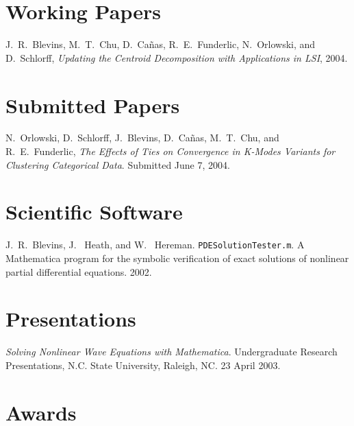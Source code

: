 \documentclass[overlapped,line,final,11pt,letterpaper]{res}
\begin{document}
\begin{resume}
\section{\bf Working Papers}

J.\ R.\ Blevins, M.\ T.\ Chu, D.\ Ca\~{n}as, R.\ E.\ Funderlic, N.\
Orlowski, and D.\ Schlorff, {\em Updating the Centroid Decomposition
  with Applications in LSI}, 2004.


\newpage

\section{\bf Submitted Papers}

N.\ Orlowski, D.\ Schlorff, J.\ Blevins, D.\ Ca\~{n}as, M.\ T.\
Chu, and R.\ E.\ Funderlic, {\em The Effects of Ties on Convergence in
  K-Modes Variants for Clustering Categorical Data}. Submitted June 7,
2004.


\section{\bf Scientific Software}

J.\ R.\ Blevins, J. \ Heath, and W. \
Hereman. \texttt{PDESolutionTester.m}.  A Mathematica program for the
symbolic verification of exact solutions of nonlinear partial
differential equations. 2002.


\section{\bf Presentations}

{\em Solving Nonlinear Wave Equations with Mathematica}. Undergraduate
Research Presentations, N.C. State University, Raleigh,
NC. 23 April 2003.



\section{\bf Awards}


\end{resume}
\end{document}
